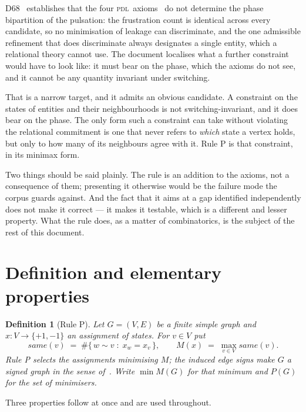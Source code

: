 \documentclass[11pt,a4paper]{article}
\def\mathrm#1{#1}%
\def\mathcal#1{#1}%
\newtheorem{definition}[theorem]{Definition}
\newcommand{\PDL}{\textsc{pdl}}
\newcommand{\same}{\mathrm{same}}
\begin{document}
D68~\citep{D68} establishes that the four \PDL\ axioms~\citep{D01} do not determine the phase bipartition of the pulsation: the frustration count is identical across every candidate, so no minimisation of leakage can discriminate, and the one admissible refinement that does discriminate always designates a single entity, which a relational theory cannot use. The document localises what a further constraint would have to look like: it must bear on the phase, which the axioms do not see, and it cannot be any quantity invariant under switching.

That is a narrow target, and it admits an obvious candidate. A constraint on the states of entities and their neighbourhoods is not switching-invariant, and it does bear on the phase. The only form such a constraint can take without violating the relational commitment is one that never refers to \emph{which} state a vertex holds, but only to how many of its neighbours agree with it. Rule P is that constraint, in its minimax form.

Two things should be said plainly. The rule is an addition to the axioms, not a consequence of them; presenting it otherwise would be the failure mode the corpus guards against. And the fact that it aims at a gap identified independently does not make it correct --- it makes it testable, which is a different and lesser property. What the rule does, as a matter of combinatorics, is the subject of the rest of this document.

\section{Definition and elementary properties}
\label{sec:definition}

\begin{definition}[Rule P]
\label{def:P}
Let $G=(V,E)$ be a finite simple graph and $x:V\to\{+1,-1\}$ an assignment of states. For $v\in V$ put
\[
\same(v) \;=\; \#\{\,w\sim v \;:\; x_w=x_v\,\},\qquad
M(x) \;=\; \max_{v\in V}\same(v).
\]
Rule P selects the assignments minimising $M$; the induced edge signs make $G$ a signed graph in the sense of~\citet{Zaslavsky1982}. Write $\min M(G)$ for that minimum and $\mathcal{P}(G)$ for the set of minimisers.
\end{definition}

Three properties follow at once and are used throughout.
\end{document}
